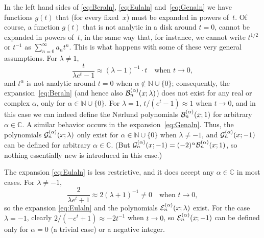 \documentclass[11pt,a4paper]{amsart}
\newcommand{\N}{\mathbb{N}}
\newcommand{\C}{\mathbb{C}}
\newcommand{\B}[1][]{\mathcal{B}\ifx#1\empty\else^{(#1)}\fi}
\newcommand{\E}[1][]{\mathcal{E}\ifx#1\empty\else^{(#1)}\fi}
\newcommand{\G}[1][]{\mathcal{G}\ifx#1\empty\else^{(#1)}\fi}
\theoremstyle{plain}
\theoremstyle{plain}
\theoremstyle{plain}
\begin{document}
In the left hand sides of \eqref{eq:Beraln}, \eqref{eq:Eulaln} and~\eqref{eq:Genaln} we have functions $g(t)$ that (for every fixed~$x$) must be expanded in powers of~$t$. Of course, a function $g(t)$ that is not analytic in a disk around $t=0$, cannot be expanded in powers of~$t$, in the same way that, for instance, we cannot write $t^{1/2}$ or $t^{-1}$ as $\sum_{n=0}^{\infty} a_n t^n$. This is what happens with some of these very general assumptions. 
For $\lambda \ne 1$, 
\[
  \frac{t}{\lambda e^t-1} \approx (\lambda-1)^{-1} \cdot t \quad \text{when } t \to 0,
\]
and $t^\alpha$ is not analytic around $t=0$ when $\alpha \notin \N \cup \{0\}$; consequently, the expansion~\eqref{eq:Beraln} (and hence also $\B[\alpha]_n(x;\lambda)$) does not exist for any real or complex $\alpha$, only for $\alpha \in \N \cup \{0\}$. For $\lambda = 1$, 
$t/(e^t-1) \approx 1$ when $t \to 0$, 
and in this case we can indeed define the N{\o}rlund polynomials $\B[\alpha]_n(x;1)$ for arbitrary $\alpha \in \C$.
A similar behavior occurs in the expansion~\eqref{eq:Genaln}. Thus, the polynomials $\G[\alpha]_n(x;\lambda)$ only exist for $\alpha \in \N \cup \{0\}$ when $\lambda \ne -1$, and $\G[\alpha]_n(x;-1)$ can be defined for arbitrary $\alpha \in \C$. (But $\G[\alpha]_n(x;-1) = (-2)^\alpha\B[\alpha]_n(x;1)$, so nothing essentially new is introduced in this case.)

The expansion \eqref{eq:Eulaln} is less restrictive, and it does accept any $\alpha \in \C$ in most cases. For $\lambda \ne -1$, 
\[
  \frac{2}{\lambda e^t+1} \approx 2(\lambda+1)^{-1} \ne 0 \quad \text{when } t \to 0,
\]
so the expansion \eqref{eq:Eulaln} and the polynomials $\E[\alpha]_n(x;\lambda)$ exist. For the case $\lambda = -1$, clearly
$2/(-e^t+1) \approx -2t^{-1}$ when $t \to 0$, 
so $\E[\alpha]_n(x;-1)$ can be defined only for $\alpha = 0$ (a trivial case) or a negative integer.
\end{document}
